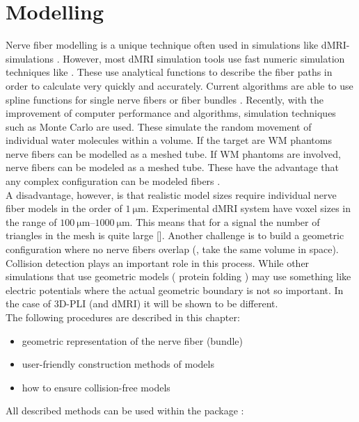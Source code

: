 \setcounter{chapter}{4}
\chapter{Modelling}
\label{chap:modelling}
% 
% 
Nerve fiber modelling is a unique technique often used in simulations like \ac{dMRI}-simulations \dummy{}.
However, most \ac{dMRI} simulation tools use fast numeric simulation techniques like \dummy{}.
These use analytical functions to describe the fiber paths in order to calculate very quickly and accurately.
Current algorithms are able to use spline functions for single nerve fibers or fiber bundles \cite{Balls2009}.
Recently, with the improvement of computer performance and algorithms, simulation techniques such as Monte Carlo \dummy{} are used.
These simulate the random movement of individual water molecules within a volume.
If the target are \ac{WM} phantoms nerve fibers can be modelled as a meshed tube.
If \ac{WM} phantoms are involved, nerve fibers can be modeled as a meshed tube.
These have the advantage that any complex configuration can be modeled \eg{} fibers \dummy{}.
\\
%
A disadvantage, however, is that realistic model sizes require individual nerve fiber models in the order of $\SI{1}{\micro\meter}$.
Experimental \ac{dMRI} system have voxel sizes in the range of $\SIrange{100}{1000}{\micro\meter}$.
This means that for a signal the number of triangles in the mesh is quite large [\dummy{}].
Another challenge is to build a geometric configuration where no nerve fibers overlap (\ie{}, take the same volume in space).
\\
% 
Collision detection plays an important role in this process.
While other simulations that use geometric models (\eg{} protein folding \dummy{}) may use something like electric potentials where the actual geometric boundary is not so important.
In the case of \ac{3D-PLI} (and \ac{dMRI}) it will be shown to be different.
\\[\baselineskip]
% 
The following procedures are described in this chapter:
\begin{itemize}[nosep]
    \item geometric representation of the nerve fiber (bundle)
    \item user-friendly construction methods of models
    \item how to ensure collision-free models
\end{itemize}
% 
All described methods can be used within the package :
